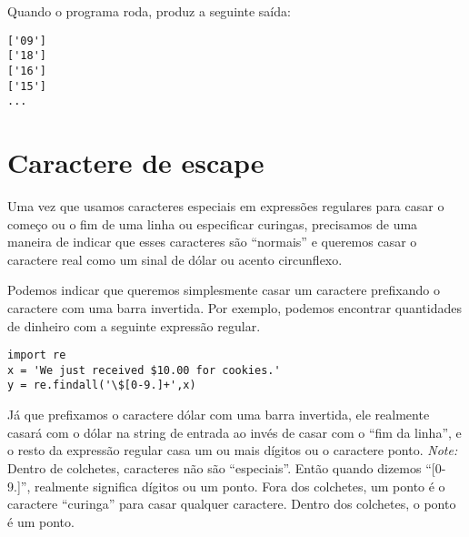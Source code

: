 Quando o programa roda, produz a seguinte saída:

\beforeverb
\begin{verbatim}
['09']
['18']
['16']
['15']
...
\end{verbatim}
\afterverb
%

\section{Caractere de escape}

Uma vez que usamos caracteres especiais em expressões regulares para casar o começo ou o fim 
de uma linha ou especificar curingas, precisamos de uma maneira de indicar que esses caracteres 
são ``normais'' e queremos casar o caractere real como um sinal de dólar ou acento circunflexo.

Podemos indicar que queremos simplesmente casar um caractere prefixando o caractere 
com uma barra invertida. Por exemplo, podemos encontrar quantidades de dinheiro com 
a seguinte expressão regular.

\beforeverb
\begin{verbatim}
import re
x = 'We just received $10.00 for cookies.'
y = re.findall('\$[0-9.]+',x)
\end{verbatim}
\afterverb
%

Já que prefixamos o caractere dólar com uma barra invertida, ele realmente casará com o dólar 
na string de entrada ao invés de casar com o ``fim da linha'', e o resto da expressão 
regular casa um ou mais dígitos ou o caractere ponto. {\em Note:} Dentro de colchetes, 
caracteres não são ``especiais''. Então quando dizemos ``[0-9.]'', realmente significa 
dígitos ou um ponto. Fora dos colchetes, um ponto é o caractere ``curinga'' para casar 
qualquer caractere. Dentro dos colchetes, o ponto é um ponto.

